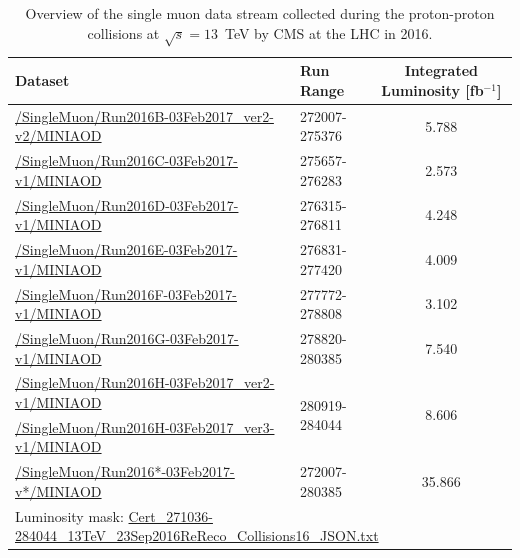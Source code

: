 \begin{table}[!h]
\label{tab:data}
\caption{Overview of the single muon data stream collected during the proton-proton collisions at $\sqrt{s}=13$~TeV by CMS at the LHC in 2016.}
\small
\renewcommand{\arraystretch}{1.5}

\begin{tabular}{llc}
        \hline 
        Dataset & Run Range & Integrated Luminosity [fb$^{-1}$]\\
        \hline
        \url{/SingleMuon/Run2016B-03Feb2017_ver2-v2/MINIAOD} & 272007-275376 & 5.788 \\
        \url{/SingleMuon/Run2016C-03Feb2017-v1/MINIAOD}      & 275657-276283 & 2.573 \\
        \url{/SingleMuon/Run2016D-03Feb2017-v1/MINIAOD}      & 276315-276811 & 4.248 \\
        \url{/SingleMuon/Run2016E-03Feb2017-v1/MINIAOD}      & 276831-277420 & 4.009 \\
        \url{/SingleMuon/Run2016F-03Feb2017-v1/MINIAOD}      & 277772-278808 & 3.102 \\
        \url{/SingleMuon/Run2016G-03Feb2017-v1/MINIAOD}      & 278820-280385 & 7.540 \\
        \url{/SingleMuon/Run2016H-03Feb2017_ver2-v1/MINIAOD} & \multirow{2}{*}{280919-284044} & \multirow{2}{*}{8.606} \\ 
        \url{/SingleMuon/Run2016H-03Feb2017_ver3-v1/MINIAOD} &                                &                        \\
        \url{/SingleMuon/Run2016*-03Feb2017-v*/MINIAOD}      & 272007-280385 & 35.866 \\
        \hline
        \multicolumn{3}{l}{Luminosity mask: \url{Cert_271036-284044_13TeV_23Sep2016ReReco_Collisions16_JSON.txt}}    \\
\end{tabular}
\end{table}

